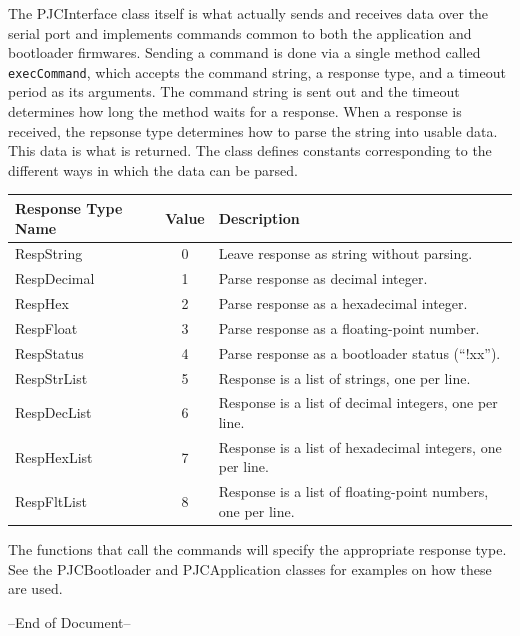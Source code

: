 \documentclass{article}
\begin{document}
The PJCInterface class itself is what actually sends and receives data over the serial port and
implements commands common to both the application and bootloader firmwares.  Sending a command is
done via a single method called \texttt{execCommand}, which accepts the command string, a response
type, and a timeout period as its arguments.  The command string is sent out and the timeout
determines how long the method waits for a response.  When a response is received, the repsonse type
determines how to parse the string into usable data.  This data is what is returned.  The class
defines constants corresponding to the different ways in which the data can be parsed.

\begin{center}
    \begin{tabular}{l|c|l}
        Response Type Name & Value & Description \\
        \hline
        RespString & 0 & Leave response as string without parsing. \\
        RespDecimal & 1 & Parse response as decimal integer. \\
        RespHex & 2 & Parse response as a hexadecimal integer. \\
        RespFloat & 3 & Parse response as a floating-point number. \\
        RespStatus & 4 & Parse response as a bootloader status (``!xx''). \\
        RespStrList & 5 & Response is a list of strings, one per line. \\
        RespDecList & 6 & Response is a list of decimal integers, one per line. \\
        RespHexList & 7 & Response is a list of hexadecimal integers, one per line. \\
        RespFltList & 8 & Response is a list of floating-point numbers, one per line. \\
    \end{tabular}
\end{center}

The functions that call the commands will specify the appropriate response type.  See the
PJCBootloader and PJCApplication classes for examples on how these are used.

\vfill

\begin{center}
--End of Document--
\end{center}
\end{document}
